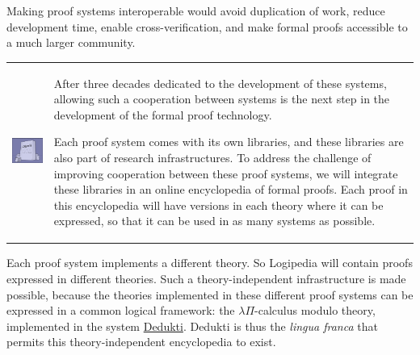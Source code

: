 Making proof systems interoperable would avoid duplication of work,
reduce development time, enable cross-verification, and make formal
proofs accessible to a much larger community.  

\medskip
\hspace{-0.8cm}
\begin{tabular}{p{}p{}}
\begin{minipage}{0.4\textwidth}
\includegraphics[width=7cm]{Illustration3_Color.jpg}
\end{minipage}
&
\begin{minipage}{10cm}
After three decades
dedicated to the development of these systems, allowing such a
cooperation between systems is the next step in the development of the
formal proof technology.

\hspace{0.4cm} 
Each proof system comes with its own libraries, and these libraries
are also part of research infrastructures. To address the challenge of
improving cooperation between these proof systems, we will integrate
these libraries in an online encyclopedia of formal proofs. Each proof
in this encyclopedia will have versions in each theory where it can be
expressed, so that it can be used in as many systems as possible.
\end{minipage}
\end{tabular}

\medskip

Each proof system implements a different theory. So Logipedia will
contain proofs expressed in different theories.  Such a
theory-independent infrastructure is made possible, because the
theories implemented in these different proof systems can be expressed
in a common logical framework: the $\lambda \Pi$-calculus modulo
theory, implemented in the system
\href{https://deducteam.github.io/}{Dedukti}. Dedukti is thus the {\em
  lingua franca} that permits this theory-independent encyclopedia to
exist.

